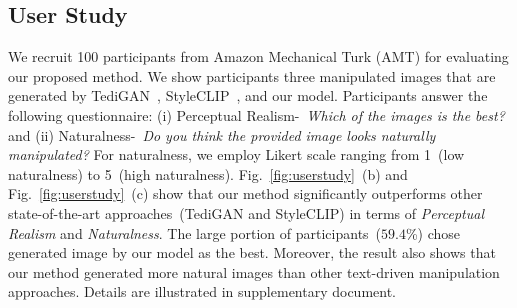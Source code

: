 \documentclass[10pt,twocolumn,letterpaper]{article}
\begin{document}


\subsection{User Study}
We recruit 100 participants from Amazon Mechanical Turk (AMT) for evaluating our proposed method. 
We show participants three manipulated images that are generated by TediGAN~\cite{xia2021tedigan}, StyleCLIP~\cite{Patashnik_2021_ICCV}, and our model. Participants answer the following questionnaire: (i) Perceptual Realism-~\textit{Which of the images is the best?} and (ii) Naturalness-~\textit{Do you think the provided image looks naturally manipulated?} For naturalness, we employ Likert scale ranging from 1~(low naturalness) to 5~(high naturalness). Fig.~\ref{fig:userstudy}~(b) and Fig.~\ref{fig:userstudy}~(c) show that our method significantly outperforms other state-of-the-art approaches~(TediGAN and StyleCLIP) in terms of \textit{Perceptual Realism} and \textit{Naturalness}. The large portion of participants~($59.4$\%) chose generated image by our model as the best. Moreover, the result also shows that our method generated more natural images than other text-driven manipulation approaches. Details are illustrated in supplementary document.%

\end{document}
